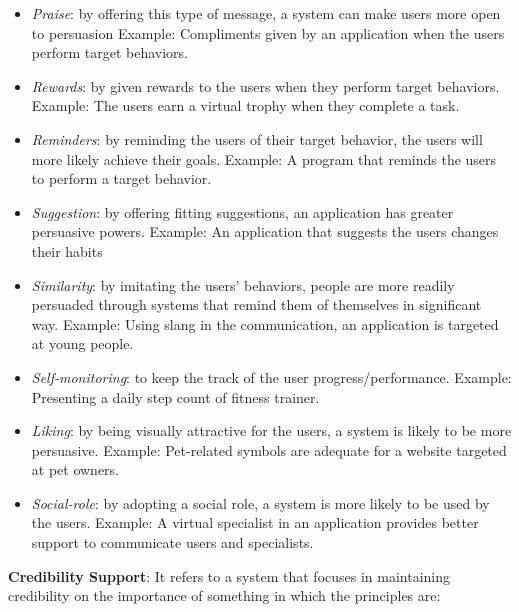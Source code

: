 \begin{itemize}
\item \emph{Praise}: by offering this type of message, a system can make users more open to persuasion
Example: Compliments given by an application when the users perform target behaviors.

\item \emph{Rewards}: by given rewards to the users when they perform target behaviors.
Example: The users earn a virtual trophy when they complete a task.

\item \emph{Reminders}: by reminding the users of their target behavior, the users will more likely achieve their goals.
Example: A program that reminds the users to perform a target behavior.

\item \emph{Suggestion}: by offering fitting suggestions, an application has greater persuasive powers.
Example: An application that suggests the users changes their habits

\item \emph{Similarity}: by imitating the users' behaviors,  people are more readily persuaded through systems that remind them of themselves in significant way.
Example: Using slang in the communication, an application is targeted at young people.

\item \emph{Self-monitoring}: to keep the track of the user progress/performance.
Example: Presenting a daily step count of fitness trainer.

\item \emph{Liking}: by being visually attractive for the users, a system is likely to be more persuasive.
Example: Pet-related symbols are adequate for a website targeted at pet owners.

\item \emph{Social-role}: by adopting a social role, a system is more likely to be used by the users.
Example: A virtual specialist in an application provides better support to communicate users and specialists.
\end{itemize}

\textbf{Credibility Support}:
It refers to a system that focuses in maintaining credibility on the importance of something in which the principles are:

